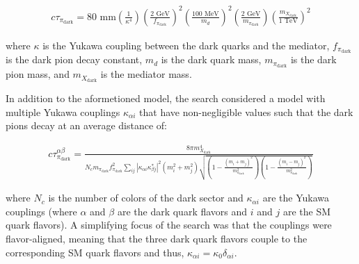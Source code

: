 \begin{equation}
	\begin{aligned}
		c\tau_{\pi_{\text{dark}}} = 80 \text{ mm} \left(\frac{1}{\kappa^4}\right) \left(\frac{2 \text{ GeV}}{f_{\pi_{\text{dark}}}}\right)^2 \left(\frac{100 \text{ MeV}}{m_d}\right)^2 \left(\frac{2 \text{ GeV}}{m_{\pi_{\text{dark}}}}\right)  \left(\frac{m_{X_{\text{dark}}}}{1 \text{ TeV}}\right)^2
	\end{aligned}
\end{equation}

\noindent where $\kappa$ is the Yukawa coupling between the dark quarks and the mediator, $f_{\pi_{\text{dark}}}$ is the dark pion decay constant, $m_d$ is the dark quark mass, $m_{\pi_{\text{dark}}}$ is the dark pion mass, and $m_{X_{\text{dark}}}$ is the mediator mass.

In addition to the aformetioned model, the search considered a model with multiple Yukawa couplings $\kappa_{\alpha i}$ that have non-negligible values such that the dark pions decay at an average distance of:

\begin{equation}
	\begin{aligned}
		c\tau_{\pi_{\text{dark}}}^{\alpha\beta} = \frac{
		8\pi m_{X_{\text{dark}}}^4
		}{
		N_c m_{\pi_{\text{dark}}}f^2_{\pi_{\text{dark}}} \sum_{ij}|\kappa_{\alpha i}\kappa_{\beta j}^{*}|^2 (m_i^2 + m_j^2) \sqrt{\left(1 - \frac{(m_i + m_j)^2}{m_{\pi_{\text{dark}}}^2}\right)\left(1-\frac{(m_i - m_j)^2}{m_{\pi_{\text{dark}}}^2}\right)}
		}
	\end{aligned}
\end{equation}

where $N_c$ is the number of colors of the dark sector and $\kappa_{\alpha i}$ are the Yukawa couplings (where $\alpha$ and $\beta$ are the dark quark flavors and $i$ and $j$ are the SM quark flavors). A simplifying focus of the search was that the couplings were flavor-aligned, meaning that the three dark quark flavors couple to the corresponding SM quark flavors and thus, $\kappa_{\alpha i} = \kappa_{0}\delta_{\alpha i}$.

